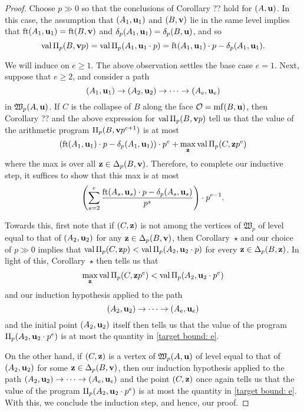 \documentclass[11pt]{amsart}
\renewcommand{\!}[1]{{\color{red}\text{$\star$\,}#1\,$\star$}}
\begin{document}
\begin{proof}  Choose $p \gg 0$ so that the conclusions of Corollary ?? hold for $(A, \mathbf{u})$.  In this case, the assumption that $(A_1, \mathbf{u}_1)$ and $(B, \mathbf{v})$ lie in the same level implies that $\operatorname{ft}(A_1, \mathbf{u}_1) = \operatorname{ft}(B, \mathbf{v})$ and $\delta_p(A_1, \mathbf{u}_1) = \delta_p(B, \mathbf{u})$, and so 
\[ \operatorname{val} \Pi_p(B, \mathbf{v}p) = \operatorname{val} \Pi_p (A_1, \mathbf{u}_1 \cdot p) = \operatorname{ft}(A_1, \mathbf{u}_1) \cdot p - \delta_p(A_1, \mathbf{u}_1). \] 

We will induce on $e \geq 1$.  The above observation settles the base case $e=1$.  Next, suppose that $e \geq 2$, and consider a path  \[ (A_1, \mathbf{u}_1) \to (A_2, \mathbf{u}_2) \to \cdots \to (A_e, \mathbf{u}_e)\] in $\mathfrak{W}_p(A, \mathbf{u})$.  If $C$ is the collapse of $B$ along the face $\mathcal{O} = \operatorname{mf}(B, \mathbf{u})$, then Corollary ??  and the above expression for $\operatorname{val} \Pi_p(B, \mathbf{v}p)$ tell us that the value of the arithmetic program $\Pi_p(B, \mathbf{v}p^{e+1})$ is at most
%
\[  \left( \operatorname{ft}(A_1, \mathbf{u}_1) \cdot p - \delta_p(A_1, \mathbf{u}_1) \right) \cdot p^e +  \max_{\mathbf{z}} \operatorname{val} \Pi_p(C, \mathbf{z}p^e) \]
%
where the max is over all $\mathbf{z} \in \Delta_p(B, \mathbf{v})$.   Therefore, to complete our inductive step, it suffices to show that this max is at most
%
\begin{equation}
\label{target bound: e}
\left( \sum_{s=2}^e \frac{ \operatorname{ft}(A_s, \mathbf{u}_s)  \cdot p - \delta_p(A_s, \mathbf{u}_s)}{p^s} \right) \cdot p^{e-1}.  \end{equation}



Towards this, first note that if $(C, \mathbf{z})$ is not among the vertices of $\mathfrak{W}_p$ of level equal to that of $(A_2, \mathbf{u}_2)$ for any $\mathbf{z} \in \Delta_p(B, \mathbf{v})$, then Corollary \!{} and our choice of $p \gg 0$ implies that $\operatorname{val} \Pi_p(C, \mathbf{z}p) < \operatorname{val} \Pi_p(A_2, \mathbf{u}_2 \cdot p)$ for every $\mathbf{z} \in \Delta_p(B, \mathbf{z})$.  In light of this, Corollary \!{} then tells us that 
\[  \max_{\mathbf{z}} \operatorname{val} \Pi_p(C, \mathbf{z}p^e) < \operatorname{val} \Pi_p(A_2, \mathbf{u}_2 \cdot p^e)\]  
and our induction hypothesis applied to the path 
\[ (A_2, \mathbf{u}_2) \to \cdots \to (A_e, \mathbf{u}_e) \] and the initial point $(A_2, \mathbf{u}_2)$ itself then tells us that the value of the program $\Pi_p(A_2, \mathbf{u}_2 \cdot p^e)$ is at most the quantity in \eqref{target bound: e}.  

On the other hand, if $(C, \mathbf{z})$ is a vertex of $\mathfrak{W}_p(A, \mathbf{u})$ of level equal to that of $(A_2, \mathbf{u}_2)$ for some $\mathbf{z} \in \Delta_p(B, \mathbf{v})$, then our induction hypothesis applied to the path 
$(A_2, \mathbf{u}_2) \to \cdots \to (A_e, \mathbf{u}_e)$ and the point $(C, \mathbf{z})$ once again tells us that the value of the program $\Pi_p(A_2, \mathbf{u}_2 \cdot p^e)$ is at most the quantity in \eqref{target bound: e}.  With this, we conclude the induction step, and hence, our proof. 
\end{proof}
\end{document}
